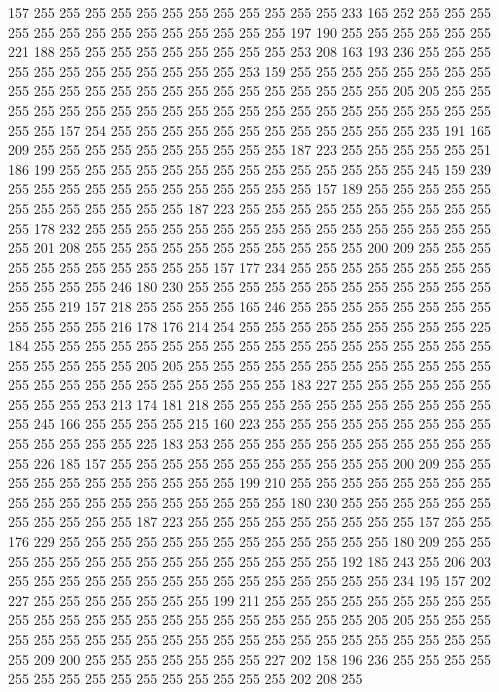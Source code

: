 157 255 255 255 255 255 255 255 255 255 255 255 255 233 165 252 255 255 255 255
255 255 255 255 255 255 255 255 255 255 197 190 255 255 255 255 255 255 221 188
255 255 255 255 255 255 255 255 255 253 208 163 193 236 255 255 255 255 255 255
255 255 255 255 255 255 253 159 255 255 255 255 255 255 255 255 255 255 255 255
255 255 255 255 255 255 255 255 255 255 255 205 205 255 255 255 255 255 255 255
255 255 255 255 255 255 255 255 255 255 255 255 255 255 255 255 157 254 255 255
255 255 255 255 255 255 255 255 255 255 235 191 165 209 255 255 255 255 255 255
255 255 255 255 187 223 255 255 255 255 255 251 186 199 255 255 255 255 255 255
255 255 255 255 255 255 255 255 245 159 239 255 255 255 255 255 255 255 255 255
255 255 255 157 189 255 255 255 255 255 255 255 255 255 255 255 255 187 223 255
255 255 255 255 255 255 255 255 255 255 178 232 255 255 255 255 255 255 255 255
255 255 255 255 255 255 255 255 255 201 208 255 255 255 255 255 255 255 255 255
255 255 200 209 255 255 255 255 255 255 255 255 255 255 255 157 177 234 255 255
255 255 255 255 255 255 255 255 255 255 246 180 230 255 255 255 255 255 255 255
255 255 255 255 255 255 255 219 157 218 255 255 255 255 165 246 255 255 255 255
255 255 255 255 255 255 255 255 216 178 176 214 254 255 255 255 255 255 255 255
255 255 225 184 255 255 255 255 255 255 255 255 255 255 255 255 255 255 255 255
255 255 255 255 255 255 255 205 205 255 255 255 255 255 255 255 255 255 255 255
255 255 255 255 255 255 255 255 255 255 255 255 183 227 255 255 255 255 255 255
255 255 255 253 213 174 181 218 255 255 255 255 255 255 255 255 255 255 255 255
245 166 255 255 255 255 215 160 223 255 255 255 255 255 255 255 255 255 255 255
255 255 255 225 183 253 255 255 255 255 255 255 255 255 255 255 255 255 226 185
157 255 255 255 255 255 255 255 255 255 255 255 200 209 255 255 255 255 255 255
255 255 255 255 255 199 210 255 255 255 255 255 255 255 255 255 255 255 255 255
255 255 255 255 255 255 180 230 255 255 255 255 255 255 255 255 255 255 255 187
223 255 255 255 255 255 255 255 255 255 157 255 255 176 229 255 255 255 255 255
255 255 255 255 255 255 255 255 180 209 255 255 255 255 255 255 255 255 255 255
255 255 255 255 255 192 185 243 255 206 203 255 255 255 255 255 255 255 255 255
255 255 255 255 255 255 234 195 157 202 227 255 255 255 255 255 255 255 199 211
255 255 255 255 255 255 255 255 255 255 255 255 255 255 255 255 255 255 255 255
255 255 255 205 205 255 255 255 255 255 255 255 255 255 255 255 255 255 255 255
255 255 255 255 255 255 255 255 209 200 255 255 255 255 255 255 255 227 202 158
196 236 255 255 255 255 255 255 255 255 255 255 255 255 255 255 255 202 208 255
